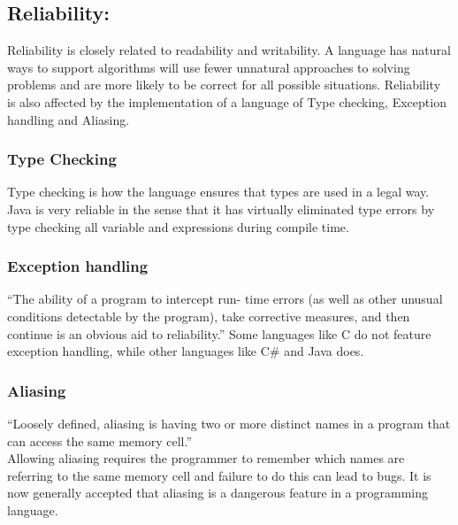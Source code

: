 \subsection*{Reliability:}
Reliability is closely related to readability and writability. A language has natural ways to support algorithms will use fewer unnatural approaches to solving problems and are more likely to be correct for all possible situations.
Reliability is also affected by the implementation of a language of Type checking, Exception handling and Aliasing.
\subsubsection*{Type Checking}
Type checking is how the language ensures that types are used in a legal way. Java is very reliable in the sense that it has virtually eliminated type errors by type checking all variable and expressions during compile time.
\subsubsection*{Exception handling}
“The ability of a program to intercept run- time errors (as well as other
unusual conditions detectable by the program), take corrective measures, and
then continue is an obvious aid to reliability.”
Some languages like C do not feature exception handling, while other languages like C\# and Java does.
\subsubsection*{Aliasing}
“Loosely defined, aliasing is having two or more distinct names in a program that can access the same memory cell.” \\
Allowing aliasing requires the programmer to remember which names are referring to the same memory cell and failure to do this can lead to bugs. It is now generally accepted
that aliasing is a dangerous feature in a programming language.




